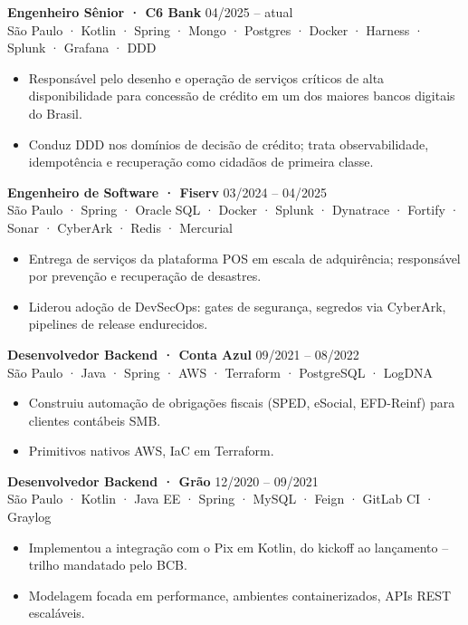\documentclass[11pt,a4paper]{article}
\begin{document}
\noindent\textbf{Engenheiro Sênior · C6 Bank} \hfill 04/2025 -- atual\\
{\small\color{muted}São Paulo · Kotlin · Spring · Mongo · Postgres · Docker · Harness · Splunk · Grafana · DDD}
\begin{itemize}
\item Responsável pelo desenho e operação de serviços críticos de alta disponibilidade para concessão de crédito em um dos maiores bancos digitais do Brasil.
\item Conduz DDD nos domínios de decisão de crédito; trata observabilidade, idempotência e recuperação como cidadãos de primeira classe.
\end{itemize}

\noindent\textbf{Engenheiro de Software · Fiserv} \hfill 03/2024 -- 04/2025\\
{\small\color{muted}São Paulo · Spring · Oracle SQL · Docker · Splunk · Dynatrace · Fortify · Sonar · CyberArk · Redis · Mercurial}
\begin{itemize}
\item Entrega de serviços da plataforma POS em escala de adquirência; responsável por prevenção e recuperação de desastres.
\item Liderou adoção de DevSecOps: gates de segurança, segredos via CyberArk, pipelines de release endurecidos.
\end{itemize}

\noindent\textbf{Desenvolvedor Backend · Conta Azul} \hfill 09/2021 -- 08/2022\\
{\small\color{muted}São Paulo · Java · Spring · AWS · Terraform · PostgreSQL · LogDNA}
\begin{itemize}
\item Construiu automação de obrigações fiscais (SPED, eSocial, EFD-Reinf) para clientes contábeis SMB.
\item Primitivos nativos AWS, IaC em Terraform.
\end{itemize}

\noindent\textbf{Desenvolvedor Backend · Grão} \hfill 12/2020 -- 09/2021\\
{\small\color{muted}São Paulo · Kotlin · Java EE · Spring · MySQL · Feign · GitLab CI · Graylog}
\begin{itemize}
\item Implementou a integração com o Pix em Kotlin, do kickoff ao lançamento -- trilho mandatado pelo BCB.
\item Modelagem focada em performance, ambientes containerizados, APIs REST escaláveis.
\end{itemize}
\end{document}
